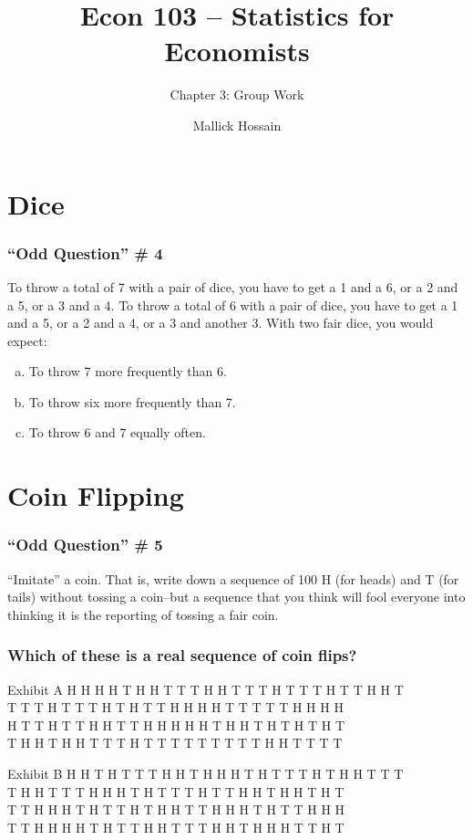 \documentclass{beamer}
\title{Econ 103 -- Statistics for Economists}
\subtitle{Chapter 3: Group Work}
\author{Mallick Hossain}
\date{}
\institute{University of Pennsylvania}
\begin{document}
 

\begin{frame}
	\titlepage 
\end{frame} 

\section{Dice}
\begin{frame}
\frametitle{``Odd Question'' \# 4}
    To throw a total of 7 with a pair of dice, you have to get a 1 and a 6, or a 2 and a 5, or a 3 and a 4.
    To throw a total of 6 with a pair of dice, you have to get a 1 and a 5, or a 2 and a 4, or a 3 and 
    another 3.
	\vspace{1em}
	With two fair dice, you would expect:
	\begin{enumerate}[(a)]
		\item To throw 7 more frequently than 6.
		\item To throw six more frequently than 7.
		\item To throw 6 and 7 equally often.
	\end{enumerate}
\end{frame}

\section{Coin Flipping}
\begin{frame}
\frametitle{``Odd Question'' \# 5}
	``Imitate'' a coin. That is, write down a sequence of 100 H (for heads) and T (for tails) without                                                                                                                     
	tossing a coin--but a sequence that you think will fool everyone into thinking it is the reporting of 
	tossing a fair coin.		
\end{frame}

\begin{frame}
\frametitle{Which of these is a real sequence of coin flips?}
	\small
	\begin{block}{Exhibit A}
	H H H H T H H T T T H H T T T H T T T H T T H H T \\
	T T T H T T T H T H T T H H H H T T T T T H H H H \\
	H T T H T T H H T T H H H H H T H H T H T H T H T \\
	T H H T H H T T T H T T T T T T T T T H H T T T T 
	\end{block}
	
	\begin{block}{Exhibit B}
	H H T H T T T H H T H H H T H T T T H T H H T T T\\
	T H H T T T H H H T H T T T H T T H H T H H T H T\\
	T T H H H T H T T H T H H T	T H H H T H T T H H H\\
	T T H H H H T H T T H H T T T H H T H H H T T H T
	\end{block}
\end{frame}
\end{document}
